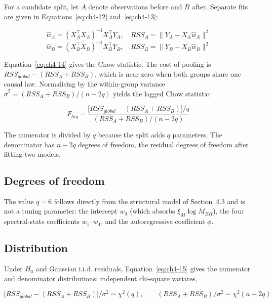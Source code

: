 For a candidate split, let $A$ denote observations before and $B$ after. Separate fits
are given in Equations~\eqref{eq:ch4-12} and~\eqref{eq:ch4-13}:

\begin{equation}
    \label{eq:ch4-12}
\hat{w}_A = (X_A^\top X_A)^{-1} X_A^\top Y_A, \quad RSS_A = \|Y_A - X_A\hat{w}_A\|^2
\end{equation}
\begin{equation}
    \label{eq:ch4-13}
\hat{w}_B = (X_B^\top X_B)^{-1} X_B^\top Y_B, \quad RSS_B = \|Y_B - X_B\hat{w}_B\|^2
\end{equation}

Equation~\eqref{eq:ch4-14} gives the Chow statistic. The cost of pooling is $RSS_{global} - (RSS_A + RSS_B)$, which is near zero when both
groups share one causal law. Normalising by the within-group variance
$\hat\sigma^2 = (RSS_A + RSS_B)/(n-2q)$ yields the lagged Chow statistic:

\begin{equation}
    \label{eq:ch4-14}
F_{lag} = \frac{\big[RSS_{global} - (RSS_A + RSS_B)\big] / q}{(RSS_A + RSS_B)/(n - 2q)}
\end{equation}

The numerator is divided by $q$ because the split adds $q$ parameters. The denominator
has $n-2q$ degrees of freedom, the residual degrees of freedom after fitting two
models.


\subsection{Degrees of freedom}

The value $q = 6$ follows directly from the structural model of Section~4.3 and is not a
tuning parameter: the intercept $w_0$ (which absorbs $\xi_M \log M_{BH}$), the four
spectral-state coefficients $w_1$--$w_4$, and the autoregressive coefficient $\phi$.


\subsection{Distribution}

Under $H_0$ and Gaussian i.i.d. residuals, Equation~\eqref{eq:ch4-15} gives the numerator and denominator distributions:
independent chi-square variates,

\begin{equation}
    \label{eq:ch4-15}
\big[RSS_{global} - (RSS_A + RSS_B)\big]/\sigma^2 \sim \chi^2(q), \qquad (RSS_A + RSS_B)/\sigma^2 \sim \chi^2(n-2q)
\end{equation}

